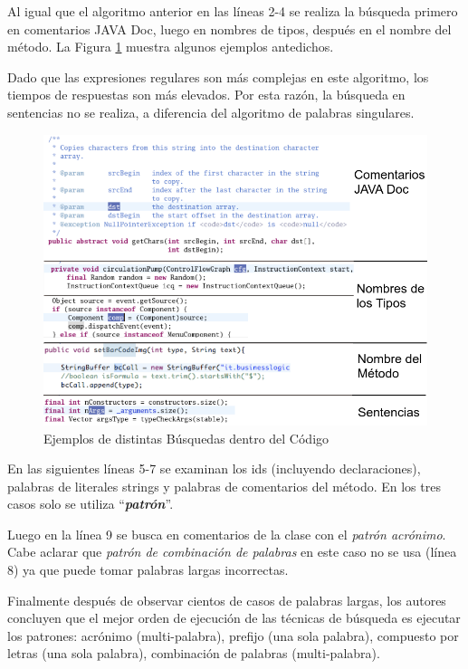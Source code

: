 Al igual que el algoritmo anterior en las líneas 2-4 se realiza la búsqueda primero en comentarios JAVA Doc, luego en nombres de tipos, después en el nombre del método. La Figura \ref{exp3} muestra algunos ejemplos antedichos.

Dado que las expresiones regulares son más complejas en este algoritmo, los tiempos de respuestas son más elevados. Por esta razón, la búsqueda en sentencias no se realiza, a diferencia del algoritmo de palabras singulares.

\begin{figure}[t] %
\centerline{%
\includegraphics[scale=0.7]{./cap3/exp_3.png}
}
\caption{Ejemplos de distintas Búsquedas dentro del Código}
\label{exp3}
\end{figure}

En las siguientes líneas 5-7 se examinan los ids (incluyendo declaraciones), palabras de literales strings y palabras de comentarios del método. En los tres casos solo se utiliza “\textit{\textbf{patrón}}”.

Luego en la línea 9 se busca en comentarios de la clase con el \textit{patrón acrónimo}. Cabe aclarar que \textit{patrón de combinación de palabras} en este caso no se usa (línea 8) ya que puede tomar palabras largas incorrectas.

Finalmente después de observar cientos de casos de palabras largas, los autores \cite{EZH08} concluyen que el mejor orden de ejecución de las técnicas de búsqueda es ejecutar los patrones: acrónimo (multi-palabra), prefijo (una sola palabra), compuesto por letras (una sola palabra), combinación de palabras (multi-palabra).

